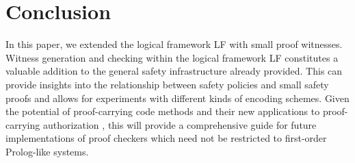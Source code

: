 \documentclass{llncs}
\begin{document}
\section{Conclusion}
In this paper, we extended the logical framework LF with small proof
witnesses. Witness generation and checking within the logical
framework LF constitutes a valuable addition to the general safety
infrastructure already provided. This can provide insights into the
relationship between safety policies and small safety proofs and
allows for experiments with different kinds of encoding schemes.
Given the potential of proof-carrying code methods and their new
applications to proof-carrying authorization
\cite{AppelFelten99,bauer:thesis}, this will provide a comprehensive
guide for future implementations of proof checkers which need not be
restricted to first-order Prolog-like systems.



\end{document}
